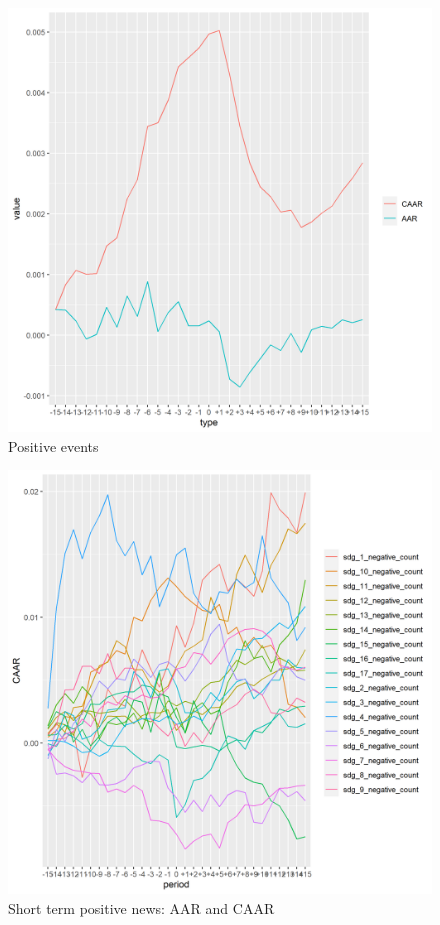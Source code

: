 \begin{figure}[!tbp]
\begin{minipage}[b]{0.45\textwidth}
    \includegraphics[scale=0.5]{Projekt/1.Figures analysis/ST_positive_all.png}
    \caption{Positive events}
  \end{minipage}
\end{figure}


\begin{figure}
    \centering
    \includegraphics[scale=0.6]{Projekt/1.Figures analysis/ST_negative_sdgs.png}
    \caption{Short term positive news: AAR and CAAR}
    \label{fig:ST_pos_news}
\end{figure}